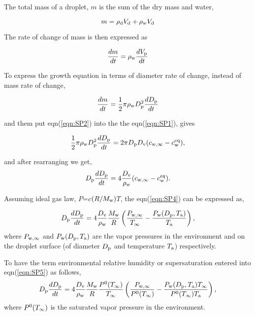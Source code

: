 \documentclass[12pt]{article}
\begin{document}
The total mass of a droplet, $m$ is the sum of the dry mass and water,

\begin{equation}\label{eqn:1.1}
m=\rho_{\rm d}V_{\rm d}+\rho_{\rm w}V_{\rm d}
\end{equation}
 
The rate of change of mass is then expressed as

\begin{equation}\label{eqn:1.2}
\frac{dm}{dt}=\rho_{\rm w} \frac{dV_{\rm p}}{dt} 
\end{equation}

To express the growth equation in terms of diameter rate of change, instead of mass rate of change,

\begin{equation}\label{eqn:SP2}
\frac{dm}{dt}=\frac{1}{2} \pi \rho_{\rm w} D_{\rm p}^{2} \frac{dD_{\rm p}}{dt}
\end{equation}

and them put eqn(\ref{eqn:SP2}) into the the eqn(\ref{eqn:SP1}), gives

\begin{equation}\label{eqn:SP3}
\frac{1}{2} \pi \rho_{\rm w} D_{\rm p}^{2} \frac{dD_{\rm p}}{dt}= 2 \pi D_{\rm p} D_{\rm v} (c_{\rm w, \infty} - c_{\rm w}^{\rm eq}),
\end{equation}

and after rearranging we get, 
\begin{equation}\label{eqn:SP4}
D_{\rm p}\frac{dD_{\rm p}}{dt}=4 \frac{D_{\rm v}} {\rho_{\rm w}} (c_{\rm w, \infty} - c_{\rm w}^{eq}).
\end{equation}

Assuming ideal gas law, $P$=$c$$(R / M_{\rm w})$$T$, the eqn(\ref{eqn:SP4}) can be expressed as,

\begin{equation}\label{eqn:SP5}
D_{\rm p}\frac{dD_{\rm p}}{dt}=4 \frac{D_{\rm v}} {\rho_{\rm w}} \frac{M_{\rm w}}{R} \left(\frac{P_{\rm w, \infty}}{T_{\infty}} - \frac{P_{\rm w}(D_{\rm p}, T_{\rm a})}{T_{\rm a}}\right),
\end{equation}
where $P_{\rm w, \infty}$ and $P_{\rm w}(D_{\rm p}, T_{\rm a})$ are the vapor pressures in the environment and on the droplet surface (of diameter $D_{\rm p}$ and temperature $T_{\rm a}$) respectively.

To have the term environmental relative humidity or supersaturation entered into eqn(\ref{eqn:SP5}) as follows,  
\begin{equation}\label{eqn:SP6}
D_{\rm p}\frac{dD_{\rm p}}{dt}=4  \frac{D_{\rm v}} {\rho_{\rm w}} \frac{M_{\rm w}}{R} \frac{P^{\rm 0}(T_{\infty})} {T_{\infty}} \left(\frac{P_{\rm w, \infty}}{P^{\rm 0}(T_{\infty})} - \frac{P_{\rm w}(D_{\rm p}, T_{\rm a}) T_{\infty}}{P^{\rm 0}(T_{\infty}) T_{\rm a}}\right),
\end{equation}
where $P^{\rm 0}(T_{\infty})$ is the saturated vapor pressure in the environment.
\end{document}
